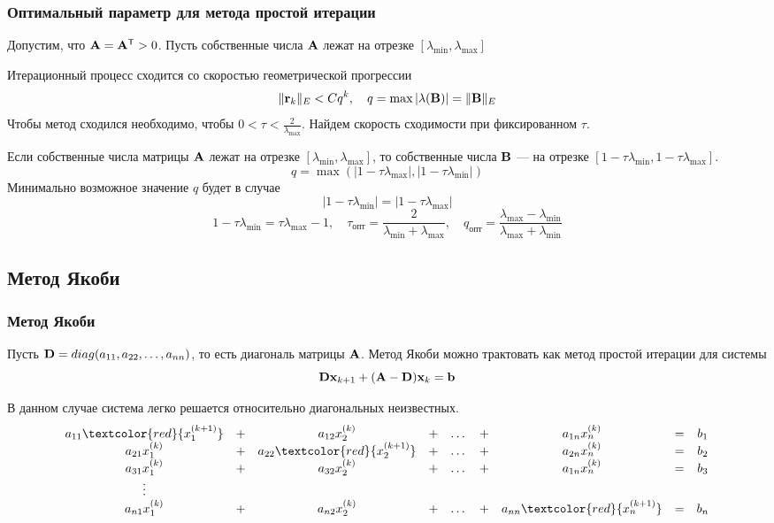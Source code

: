 \documentclass[apectratio=43,unicode]{beamer}
\begin{document}
\begin{frame}\frametitle{Оптимальный параметр для метода простой итерации}
	Допустим, что $\mathbf{A} = \mathbf{A}^{\mathsf{T}} > 0$. Пусть собственные числа $\mathbf{A}$ лежат на
отрезке $[\lambda_{\min}, \lambda_{\max}]$
	\pause

	Итерационный процесс сходится со скоростью геометрической прогрессии
	\[
	\|\mathbf{r}_k\|_E < Cq^k,\quad q = \max |\lambda(\mathbf{B})| = \|\mathbf{B}\|_E
	\]
	\pause
	Чтобы метод сходился необходимо, чтобы $0 < \tau < \frac{2}{\lambda_{\max}}$. Найдем скорость сходимости при фиксированном $\tau$.

	\pause
	Если собственные числа матрицы $\mathbf{A}$ лежат на отрезке $[\lambda_{\min},
\lambda_{\max}]$,
то собственные числа $\mathbf{B}$ --- на отрезке $[1-\tau \lambda_{\min}, 1-\tau
\lambda_{\max}]$.
	\[
	q = \max(|1-\tau \lambda_{\max}|, |1-\tau \lambda_{\min}|)
	\]
	Минимально возможное значение $q$ будет в случае
	\[|1-\tau \lambda_{\min}| = |1-\tau \lambda_{\max}|\]
	\[
	1 - \tau \lambda_{\min} = \tau \lambda_{\max} - 1, \quad \tau_\text{опт} =
\frac{2}{\lambda_{\min}+\lambda_{\max}}, \quad q_\text{опт} =
\frac{\lambda_{\max}-\lambda_{\min}}{\lambda_{\max}+\lambda_{\min}}
	\]
\end{frame}

\subsection{Метод Якоби}
\begin{frame}\frametitle{Метод Якоби}
	Пусть $\mathbf{D} = \mathop{diag}(a_{11}, a_{22}, \dots, a_{nn})$, то есть диагональ матрицы $\mathbf{A}$. 
	Метод Якоби можно трактовать как метод простой итерации для системы
	$$
	\mathbf{D} \mathbf{x}_{k+1} + (\mathbf{A}-\mathbf{D}) \mathbf{x}_k = \mathbf{b}
	$$

	В данном случае система легко решается относительно диагональных
неизвестных.
	\begin{equation*}
	\begin{array}{ccccccccc}
	a_{11} \textcolor{red}{x^{(k+1)}_{1}} &+& a_{12} x^{(k)}_{2}  &+& \dots &+& a_{1n} x^{(k)}_{n} &=& b_1\\
	a_{21} x^{(k)}_{1} &+& a_{22} \textcolor{red}{x^{(k+1)}_{2}} &+& \dots &+& a_{2n} x^{(k)}_{n} &=& b_2\\
	a_{31} x^{(k)}_{1} &+& a_{32} x^{(k)}_{2} &+& \dots &+& a_{1n} x^{(k)}_{n} &=& b_3\\
	\vdots\\
	a_{n1} x^{(k)}_{1} &+& a_{n2} x^{(k)}_{2} &+& \dots &+& a_{nn}
\textcolor{red}{x^{(k+1)}_{n}} &=& b_n
	\end{array}
	\end{equation*}
\end{frame}
\end{document}
